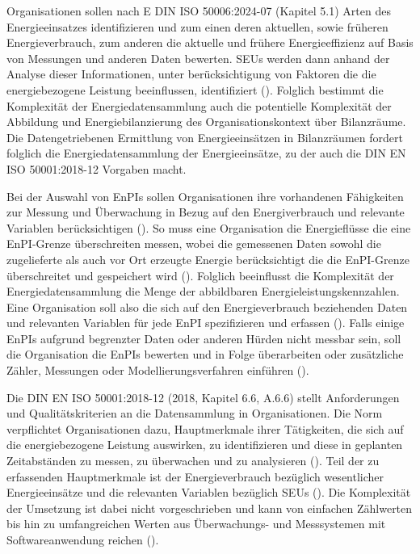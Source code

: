 Organisationen sollen nach E DIN ISO 50006:2024-07 (Kapitel 5.1) Arten des Energieeinsatzes identifizieren und zum einen deren aktuellen, sowie früheren 
Energieverbrauch, zum anderen die aktuelle und frühere Energieeffizienz auf Basis von Messungen und anderen Daten bewerten. 
SEUs werden dann anhand der Analyse dieser Informationen, unter berücksichtigung von Faktoren die die energiebezogene Leistung beeinflussen, 
identifiziert (\cite[Kapitel 5.1]{DIN50006.2024}). 
Folglich bestimmt die Komplexität der Energiedatensammlung auch die potentielle Komplexität der Abbildung und Energiebilanzierung 
des Organisationskontext über Bilanzräume. 
Die Datengetriebenen Ermittlung von Energieeinsätzen in Bilanzräumen fordert folglich die Energiedatensammlung der Energieeinsätze, 
zu der auch die DIN EN ISO 50001:2018-12 Vorgaben macht.

Bei der Auswahl von EnPIs sollen Organisationen ihre vorhandenen Fähigkeiten zur Messung und Überwachung in Bezug auf den 
Energiverbrauch und relevante Variablen berücksichtigen (\cite[S. 21]{DIN50006.2024}).
So muss eine Organisation die Energieflüsse die eine EnPI-Grenze überschreiten messen, wobei die gemessenen Daten sowohl die 
zugelieferte als auch vor Ort erzeugte Energie berücksichtigt die die EnPI-Grenze überschreitet und gespeichert wird (\cite[S. 17]{DIN50006.2024}).
Folglich beeinflusst die Komplexität der Energiedatensammlung die Menge der abbildbaren Energieleistungskennzahlen. 
Eine Organisation soll also die sich auf den Energieverbrauch beziehenden Daten und relevanten Variablen für jede EnPI spezifizieren und erfassen (\cite[S. 18]{DIN50006.2024}).
Falls einige EnPIs aufgrund begrenzter Daten oder anderen Hürden nicht messbar sein, soll die Organisation die EnPIs bewerten und in Folge überarbeiten oder 
zusätzliche Zähler, Messungen oder Modellierungsverfahren einführen (\cite[S. 18]{DIN50006.2024}).

Die DIN EN ISO 50001:2018-12 (2018, Kapitel 6.6, A.6.6) stellt Anforderungen und Qualitätskriterien an die Datensammlung in Organisationen.
Die Norm verpflichtet Organisationen dazu, Hauptmerkmale ihrer Tätigkeiten, die sich auf die energiebezogene Leistung auswirken, zu identifizieren und diese in geplanten
Zeitabständen zu messen, zu überwachen und zu analysieren (\cite[S. 23]{DIN50001.2018}).
Teil der zu erfassenden Hauptmerkmale ist der Energieverbrauch bezüglich wesentlicher Energieeinsätze und die relevanten Variablen bezüglich SEUs (\cite[S. 23]{DIN50001.2018}). 
Die Komplexität der Umsetzung ist dabei nicht vorgeschrieben und kann von einfachen Zählwerten bis hin zu umfangreichen Werten aus Überwachungs- und Messsystemen mit
Softwareanwendung reichen (\cite[S. 36]{DIN50001.2018}).

